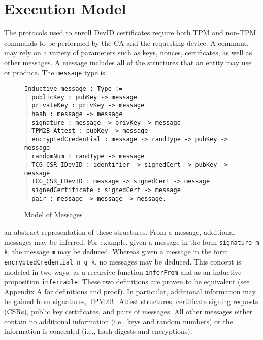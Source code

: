 
\chapter{Execution Model}

The protocols used to enroll DevID certificates require both TPM and non-TPM commands to be performed by the CA and the requesting device. A command may rely on a variety of parameters such as keys, nonces, certificates, as well as other messages. A message includes all of the structures that an entity may use or produce. The \verb|message| type is 
\begin{figure}[h]
\begin{lstlisting}[language=Coq]
Inductive message : Type :=
| publicKey : pubKey -> message
| privateKey : privKey -> message
| hash : message -> message
| signature : message -> privKey -> message
| TPM2B_Attest : pubKey -> message
| encryptedCredential : message -> randType -> pubKey -> message
| randomNum : randType -> message
| TCG_CSR_IDevID : identifier -> signedCert -> pubKey -> message
| TCG_CSR_LDevID : message -> signedCert -> message
| signedCertificate : signedCert -> message
| pair : message -> message -> message.
\end{lstlisting}
\caption{Model of Messages}
\end{figure}
an abstract representation of these structures. From a message, additional messages may be inferred. For example, given a message in the form \verb|signature m k|, the message \verb|m| may be deduced. Whereas given a message in the form \verb|encryptedCredential n g k|, no messages may be deduced. This concept is modeled in two ways: as a recursive function \verb|inferFrom| and as an inductive proposition \verb|inferrable|. These two definitions are proven to be equivalent (see Appendix A for definitions and proof). In particular, additional information may be gained from signatures, TPM2B\_Attest structures, certificate signing requests (CSRs), public key certificates, and pairs of messages. All other messages either contain no additional information (i.e., keys and random numbers) or the information is concealed (i.e., hash digests and encryptions). 



